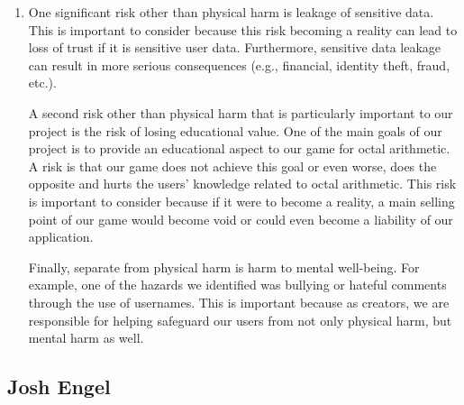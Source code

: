 \documentclass{article}
\begin{document}
\begin{enumerate}
    During this deliverable, we thought of risks related to data loss or corruption. These risks came about by talking with our TA during the informal meeting. Another risk that we found during the Hazard Analysis process was risks relating to the game state, such as losing game state data or loading the incorrect game state. We realized the importance of this risk after looking at the RLCatan sample Hazard Analysis. With strong parallels to our game-based project, we found that the risks associated with the Game State Manager were similar. As such, we adapted aspects from that example project to fit our program/application. Finally, through brainstorming, we came up with an additional health hazard related to mental health with bullying / hateful language.

    \item One significant risk other than physical harm is leakage of sensitive data. This is important to consider because this risk becoming a reality can lead to loss of trust if it is sensitive user data. Furthermore, sensitive data leakage can result in more serious consequences (e.g., financial, identity theft, fraud, etc.).

    A second risk other than physical harm that is particularly important to our project is the risk of losing educational value. One of the main goals of our project is to provide an educational aspect to our game for octal arithmetic. A risk is that our game does not achieve this goal or even worse, does the opposite and hurts the users' knowledge related to octal arithmetic. This risk is important to consider because if it were to become a reality, a main selling point of our game would become void or could even become a liability of our application.

    Finally, separate from physical harm is harm to mental well-being. For example, one of the hazards we identified was bullying or hateful comments through the use of usernames. This is important because as creators, we are responsible for helping safeguard our users from not only physical harm, but mental harm as well.
\end{enumerate}

\subsection*{Josh Engel}
\end{document}

